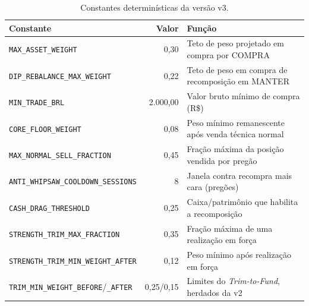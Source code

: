 \documentclass{eic-bcc-tcc}
\begin{document}
\begin{table}[htbp]
\centering
\caption{Constantes determinísticas da versão v3.}
\label{tab:constantes-v3}
\small
\begin{tabular}{l r p{6.4cm}}
\toprule
\textbf{Constante} & \textbf{Valor} & \textbf{Função} \\
\midrule
\texttt{MAX\_ASSET\_WEIGHT} & 0,30 & Teto de peso projetado em compra por COMPRA \\
\texttt{DIP\_REBALANCE\_MAX\_WEIGHT} & 0,22 & Teto de peso em compra de recomposição em MANTER \\
\texttt{MIN\_TRADE\_BRL} & 2.000,00 & Valor bruto mínimo de compra (R\$) \\
\texttt{CORE\_FLOOR\_WEIGHT} & 0,08 & Peso mínimo remanescente após venda técnica normal \\
\texttt{MAX\_NORMAL\_SELL\_FRACTION} & 0,45 & Fração máxima da posição vendida por pregão \\
\texttt{ANTI\_WHIPSAW\_COOLDOWN\_SESSIONS} & 8 & Janela contra recompra mais cara (pregões) \\
\texttt{CASH\_DRAG\_THRESHOLD} & 0,25 & Caixa/patrimônio que habilita a recomposição \\
\texttt{STRENGTH\_TRIM\_MAX\_FRACTION} & 0,35 & Fração máxima de uma realização em força \\
\texttt{STRENGTH\_TRIM\_MIN\_WEIGHT\_AFTER} & 0,12 & Peso mínimo após realização em força \\
\texttt{TRIM\_MIN\_WEIGHT\_BEFORE}/\texttt{\_AFTER} & 0,25/0,15 & Limites do \textit{Trim-to-Fund}, herdados da v2 \\
\bottomrule
\end{tabular}
\end{table}
\end{document}
